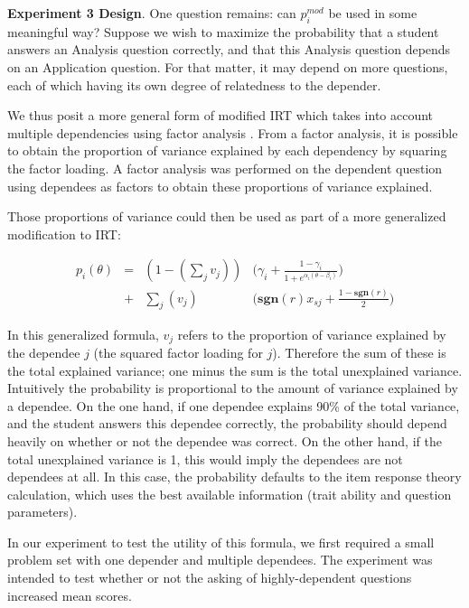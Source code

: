 \textbf{Experiment 3 Design}.  One question remains: can $p_i^{mod}$ be used in
some meaningful way?  Suppose we wish to maximize the probability that a
student answers an Analysis question correctly, and that this Analysis question
depends on an Application question.  For that matter, it may depend on more
questions, each of which having its own degree of relatedness to the depender.

We thus posit a more general form of modified IRT which takes into account
multiple dependencies using factor analysis \cite{kim1978}.  From a factor
analysis, it is possible to obtain the proportion of variance explained by each
dependency by squaring the factor loading.  A factor analysis was performed on
the dependent question using dependees as factors to obtain these proportions
of variance explained.

Those proportions of variance could then be used as part of a more generalized
modification to IRT:

\begin{align*}
  p_i(\theta) &=& (1- (\displaystyle\sum_j v_j)) & \Big(\gamma_i + \frac{1-\gamma_i}{1+e^{\alpha_i(\theta-\beta_i)}}\Big) \\
              &+& \displaystyle\sum_j (v_j)   & \Big(\mathbf{sgn}(r)x_{sj}+\frac{1-\mathbf{sgn}(r)}{2}\Big)
\end{align*}

In this generalized formula, $v_j$ refers to the proportion of variance
explained by the dependee $j$ (the squared factor loading for $j$).  Therefore
the sum of these is the total explained variance; one minus the sum is the
total unexplained variance.  Intuitively the probability is proportional to the
amount of variance explained by a dependee.  On the one hand, if one dependee
explains 90\% of the total variance, and the student answers this dependee
correctly, the probability should depend heavily on whether or not the dependee
was correct.  On the other hand, if the total unexplained variance is 1, this
would imply the dependees are not dependees at all.  In this case, the
probability defaults to the item response theory calculation, which uses the
best available information (trait ability and question parameters).

In our experiment to test the utility of this formula, we first required a
small problem set with one depender and multiple dependees.  The experiment
was intended to test whether or not the asking of highly-dependent questions
increased mean scores.


